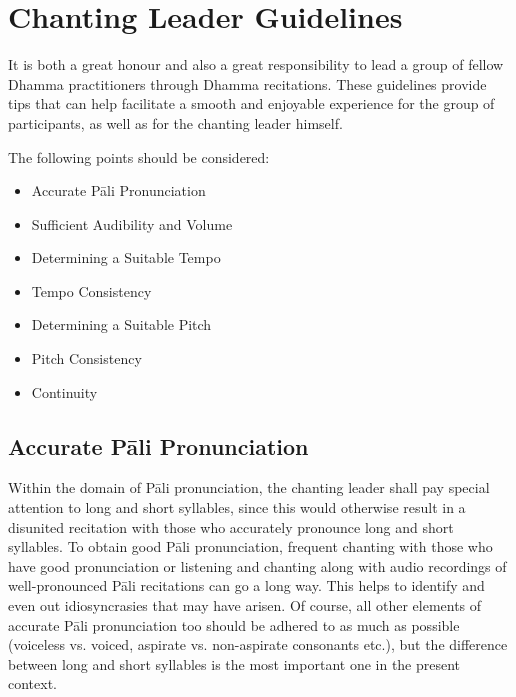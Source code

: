 \section{Chanting Leader Guidelines}

\begin{justify}
  It is both a great honour and also a great responsibility to lead a group of fellow Dhamma practitioners through Dhamma recitations. These guidelines provide tips that can help facilitate a smooth and enjoyable experience for the group of participants, as well as for the chanting leader himself.
\end{justify}

The following points should be considered:

\begin{itemize}
  \item Accurate Pāli Pronunciation
  \item Sufficient Audibility and Volume
  \item Determining a Suitable Tempo
  \item Tempo Consistency
  \item Determining a Suitable Pitch
  \item Pitch Consistency
  \item Continuity
\end{itemize}

\subsection*{Accurate Pāli Pronunciation}
\begin{justify}
  Within the domain of Pāli pronunciation, the chanting leader shall pay special attention to long and short syllables, since this would otherwise result in a disunited recitation with those who accurately pronounce long and short syllables. To obtain good Pāli pronunciation, frequent chanting with those who have good pronunciation or listening and chanting along with audio recordings of well-pronounced Pāli recitations can go a long way. This helps to identify and even out idiosyncrasies that may have arisen. Of course, all other elements of accurate Pāli pronunciation too should be adhered to as much as possible (voiceless vs. voiced, aspirate vs. non-aspirate consonants etc.), but the difference between long and short syllables is the most important one in the present context.
\end{justify}

